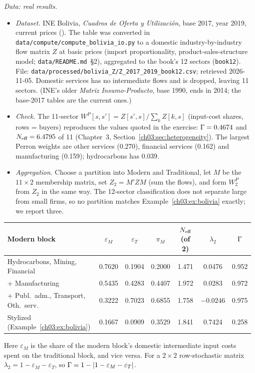 \documentclass[../solutions_manual.tex]{subfiles}
\begin{document}
 \emph{Data: real results.}
\begin{itemize}
\item \emph{Dataset.} INE Bolivia, \textit{Cuadros de Oferta y Utilizaci\'on}, base 2017, year 2019, current prices (\citealp{ine2026sut}). The table was converted in \texttt{data/compute/compute\_bolivia\_io.py} to a domestic industry-by-industry flow matrix $Z$ at basic prices (import proportionality, product-sales-structure model; \texttt{data/README.md}~\S2), aggregated to the book's 12 sectors (\texttt{book12}). File: \nolinkurl{data/processed/bolivia_Z/Z_2017_2019_book12.csv}; retrieved 2026-11-05. Domestic services has no intermediate flows and is dropped, leaving 11 sectors. (INE's older \textit{Matriz Insumo-Producto}, base 1990, ends in 2014; the base-2017 tables are the current ones.)
\item \emph{Check.} The 11-sector $W^P[s,s'] = Z[s',s]/\sum_k Z[k,s]$ (input-cost shares, rows = buyers) reproduces the values quoted in the exercise: $\Gamma = 0.4674$ and $N_{\text{eff}} = 6.4795$ of 11 (Chapter~3, Section~\ref{ch03:sec:heterogeneity}). The largest Perron weights are other services (0.270), financial services (0.162) and manufacturing (0.159); hydrocarbons has $0.039$.
\item \emph{Aggregation.} Choose a partition into Modern and Traditional, let $M$ be the $11\times 2$ membership matrix, set $Z_2 = M'ZM$ (sum the flows), and form $W^P_2$ from $Z_2$ in the same way. The 12-sector classification does not separate large from small firms, so no partition matches Example~\ref{ch03:ex:bolivia} exactly; we report three.
\end{itemize}
\begin{center}
\footnotesize
\setlength{\tabcolsep}{4pt}
\begin{tabular}{lcccccc}
\toprule
Modern block & $\varepsilon_M$ & $\varepsilon_T$ & $\pi_M$ & $N_{\text{eff}}$ (of 2) & $\lambda_2$ & $\Gamma$ \\
\midrule
Hydrocarbons, Mining, Financial & 0.7620 & 0.1904 & 0.2000 & 1.471 & 0.0476 & 0.952 \\
\quad + Manufacturing & 0.5435 & 0.4283 & 0.4407 & 1.972 & 0.0283 & 0.972 \\
\quad + Publ.\ adm., Transport, Oth.\ serv. & 0.3222 & 0.7023 & 0.6855 & 1.758 & $-0.0246$ & 0.975 \\
\midrule
Stylized (Example~\ref{ch03:ex:bolivia}) & 0.1667 & 0.0909 & 0.3529 & 1.841 & 0.7424 & 0.258 \\
\bottomrule
\end{tabular}
\end{center}
Here $\varepsilon_M$ is the share of the modern block's domestic intermediate input costs spent on the traditional block, and vice versa. For a $2\times 2$ row-stochastic matrix $\lambda_2 = 1 - \varepsilon_M - \varepsilon_T$, so $\Gamma = 1 - |1 - \varepsilon_M - \varepsilon_T|$.
\end{document}
